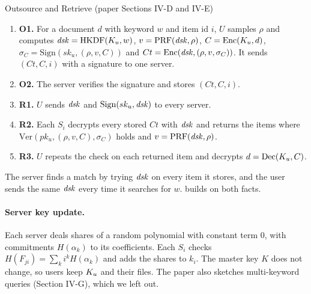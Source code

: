\begin{protocol}{Outsource and Retrieve (paper Sections IV-D and IV-E)}
\begin{enumerate}[1.]
  \item \textbf{O1.} For a document $d$ with keyword $w$ and item id $i$, $U$ samples $\rho$ and computes
        $\mathit{dsk} = \mathrm{HKDF}(K_u, w)$, $v = \mathrm{PRF}(\mathit{dsk}, \rho)$, $C = \mathrm{Enc}(K_u, d)$,
        $\sigma_C = \mathrm{Sign}(sk_u, (\rho, v, C))$ and $Ct = \mathrm{Enc}(\mathit{dsk}, (\rho, v, \sigma_C))$. It sends
        $(Ct, C, i)$ with a signature to one server.
  \item \textbf{O2.} The server verifies the signature and stores $(Ct, C, i)$.
  \item \textbf{R1.} $U$ sends $\mathit{dsk}$ and $\mathrm{Sign}(sk_u, \mathit{dsk})$ to every server.
  \item \textbf{R2.} Each $S_i$ decrypts every stored $Ct$ with $\mathit{dsk}$ and returns the items where
        $\mathrm{Ver}(pk_u, (\rho, v, C), \sigma_C)$ holds and $v = \mathrm{PRF}(\mathit{dsk}, \rho)$.
  \item \textbf{R3.} $U$ repeats the check on each returned item and decrypts $d = \mathrm{Dec}(K_u, C)$.
\end{enumerate}
\end{protocol}

The server finds a match by trying $\mathit{dsk}$ on every item it stores, and the user sends the same $\mathit{dsk}$ every time it
searches for $w$.  builds on both facts.

\paragraph{Server key update.} Each server deals shares of a random polynomial with constant term 0, with
commitments $H(\alpha_k)$ to its coefficients. Each $S_i$ checks $H(F_{ji}) = \sum_k i^k H(\alpha_k)$ and adds the
shares to $k_i$. The master key $K$ does not change, so users keep $K_u$ and their files. The paper also sketches
multi-keyword queries (Section IV-G), which we left out.
